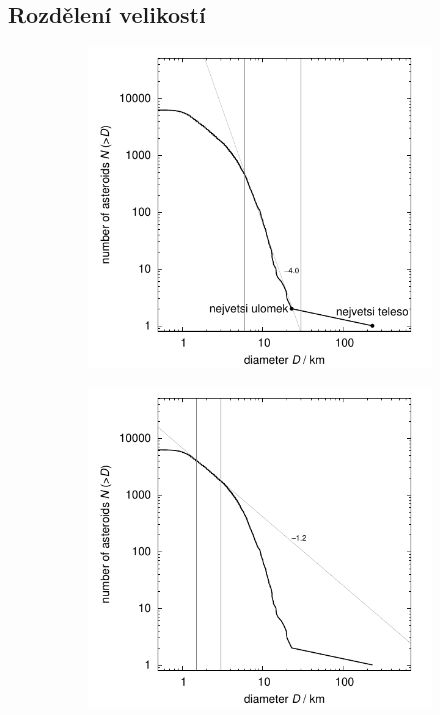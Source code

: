 \documentclass[A4paper, 12pt, oneside]{book}
\begin{document}
\subsection{Rozdělení velikostí}
\begin{figure}
	\centering
	\begin{subfigure}[b]{0.45\textwidth}
	\includegraphics[width=\textwidth]{obr/size_distribution}
	\end{subfigure}
	\begin{subfigure}[b]{0.45\textwidth}
	\includegraphics[width=\textwidth]{obr/size_distribution_SMALLD}

\end{subfigure}
\end{figure}
\end{document}
